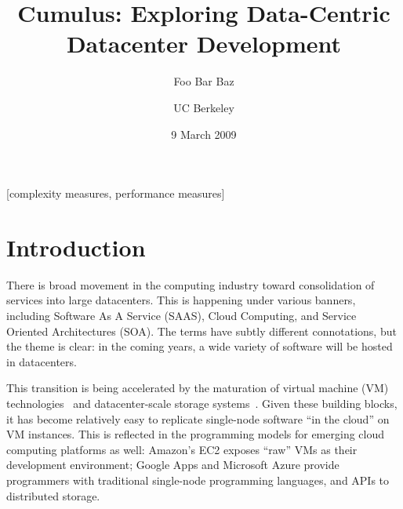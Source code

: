 \documentclass{sig-alternate}
\begin{document}

\newcommand{\BOOM} {Cumulus}
\newcommand{\JOL} {LogJam}

\title{\BOOM: Exploring Data-Centric Datacenter Development}
\author{
\alignauthor
Foo
\alignauthor
Bar
\alignauthor
Baz
\and
UC Berkeley
}
\date{9 March 2009}

\maketitle
\begin{abstract}
\end{abstract}

[complexity measures, performance measures]


\section{Introduction}
There is broad movement in the computing industry toward consolidation of  services into large datacenters.  This is happening under various banners, including Software As A Service (SAAS), Cloud Computing, and Service Oriented Architectures (SOA).  The terms have subtly different connotations, but the theme is clear: in the coming years, a wide variety of software will be hosted in datacenters.

This transition is being accelerated by the maturation of virtual machine (VM) technologies~\cite{vmsurvey} and datacenter-scale storage systems~\cite{GFS,S3,SSDS}.  Given these building blocks, it has become relatively easy to replicate single-node software ``in the cloud'' on VM instances.  This is reflected in the programming models for emerging cloud computing platforms as well: Amazon's EC2 exposes ``raw'' VMs as their development environment; Google Apps and Microsoft Azure provide programmers with traditional single-node programming languages, and APIs to distributed storage.
\end{document}
